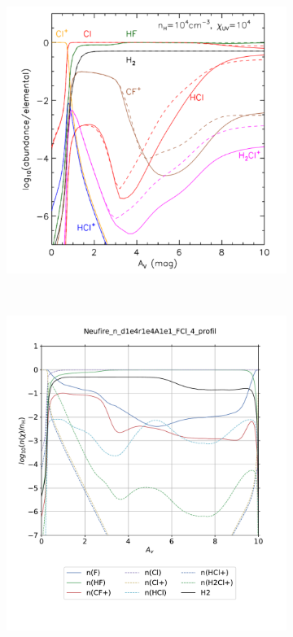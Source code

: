 \begin{figure}[!htbp]
    \centering
    \begin{subfigure}[t]{0.49\textwidth} %
        \centering \includegraphics[trim = {0 0 0 0cm},clip,width=1\textwidth]{figure/Cl/neufire/dens.pdf}
        \caption{}
    \end{subfigure}
    ~ 
    \begin{subfigure}[t]{0.49\textwidth}
        \centering \includegraphics[trim = {0 2cm 0 1.8cm},clip,width=1\textwidth]{figure/Cl/neufire/HCl_profil.pdf}
        \caption{}
    \end{subfigure}
    

\end{figure}
